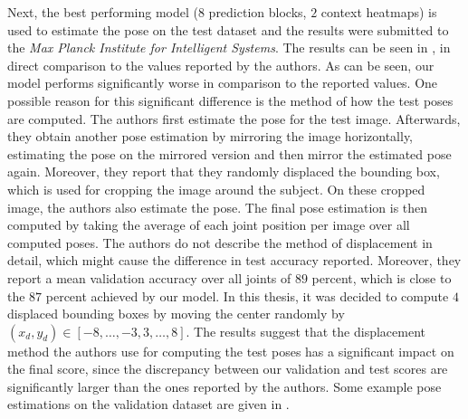 \begin{table}[]
    \centering
    \caption{PCKh test results of our recreation in direct comparison to the original work by \cite{luvizon_2d/3d_2018} using $\alpha = 0.5$. The change in total accuracy is statistically significant with a significance level of $0.05$. }
    \label{tab:mpii_test}
\end{table}

Next, the best performing model ($8$ prediction blocks, $2$ context heatmaps) is used to estimate the pose on the test dataset and the results were submitted to the \textit{Max Planck Institute for Intelligent Systems}.
The results can be seen in , in direct comparison to the values reported by the authors.
As can be seen, our model performs significantly worse in comparison to the reported values.
One possible reason for this significant difference is the method of how the test poses are computed.
The authors first estimate the pose for the test image.
Afterwards, they obtain another pose estimation by mirroring the image horizontally, estimating the pose on the mirrored version and then mirror the estimated pose again.
Moreover, they report that they randomly displaced the bounding box, which is used for cropping the image around the subject.
On these cropped image, the authors also estimate the pose.
The final pose estimation is then computed by taking the average of each joint position per image over all computed poses.
The authors do not describe the method of displacement in detail, which might cause the difference in test accuracy reported.
Moreover, they report a mean validation accuracy over all joints of $89$ percent, which is close to the $87$ percent achieved by our model.
In this thesis, it was decided to compute $4$ displaced bounding boxes by moving the center randomly by $(x_d, y_d) \in [-8, \dots, -3, 3, \dots, 8]$.
The results suggest that the displacement method the authors use for computing the test poses has a significant impact on the final score, since the discrepancy between our validation and test scores are significantly larger than the ones reported by the authors.
Some example pose estimations on the validation dataset are given in .

